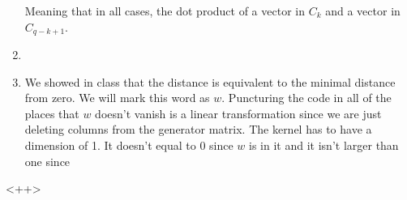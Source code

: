 \documentclass{article}
\begin{document}
\begin{enumerate}
    Meaning that in all cases, the dot product of a vector in $C_k$ and a vector in $C_{q-k+1}$.
        \item 
        \item We showed in class that the distance is equivalent to the minimal distance from zero. We will mark this word as $w$. Puncturing the code in all of the places that $w$ doesn't vanish is a linear transformation since we are just deleting columns from the generator matrix. The kernel has to have a dimension of 1. It doesn't equal to 0 since $w$ is in it and it isn't larger than one since
    \end{enumerate}<++>
\end{document}
